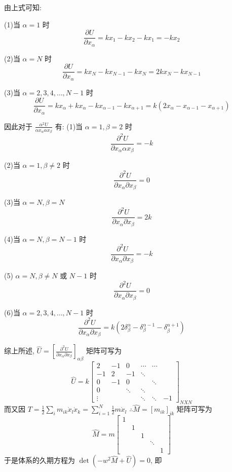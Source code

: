 \documentclass[11pt, a4paper, oneside]{ctexart}
\begin{document}
{{{\begin{appendices}
{        由上式可知:

        (1)当 $\alpha=1$ 时
        $$
        \frac{\partial U}{\partial x_{\alpha}}=k x_{1}-k x_{2}-k x_{1}=-k x_{2}
        $$

        (2)当 $\alpha=N$ 时
        $$
        \frac{\partial U}{\partial x_{\alpha}}=k x_{N}-k x_{N-1}-k x_{N}=2 k x_{N}-k x_{N-1}
        $$

        (3)当 $\alpha=2,3,4, \ldots, N-1$ 时
        $$
        \frac{\partial U}{\partial x_{\alpha}}=k x_{\alpha}+k x_{\alpha}-k x_{\alpha-1}-k x_{\alpha+1}=k\left(2 x_{\alpha}-x_{\alpha-1}-x_{\alpha+1}\right)
        $$

因此对于 $\frac{\alpha^{2} U}{\alpha x_{\alpha} \alpha x_{\beta}}$ 有:
(1)当 $\alpha=1, \beta=2$ 时
$$
\frac{\partial^{2} U}{\partial x_{\alpha} \alpha x_{\beta}}=-k
$$

(2)当 $\alpha=1, \beta \neq 2$ 时
$$
\frac{\partial^{2} U}{\partial x_{\alpha} \partial x_{\beta}}=0
$$

(3)当 $\alpha=N, \beta=N$
$$
\frac{\partial^{2} U}{\partial x_{\alpha} \partial x_{\beta}}=2 k
$$

(4)当 $\alpha=N, \beta=N-1$ 时
$$
\frac{\partial^{2} U}{\partial x_{\alpha} \partial x_{\beta}}=-k
$$

(5) $\alpha=N, \beta \neq N$ 或 $N-1$ 时
$$
\frac{\partial^{2} U}{\partial x_{\alpha} \partial x_{\beta}}=0
$$

(6)当 $\alpha=2,3,4, \ldots, N-1$ 时
$$
\frac{\partial^{2} U}{\partial x_{\alpha} \partial x_{\beta}}=k\left(2 \delta_{\beta}^{\alpha}-\delta_{\beta}^{\alpha-1}-\delta_{\beta}^{\alpha+1}\right)
$$

综上所述, $\hat{U}=\left[\frac{\partial^{2} U}{\partial x_{\alpha} \partial x_{\beta}}\right]_{\alpha \beta}$ 矩阵可写为
$$
\hat{U}=k\left[\begin{array}{cccccc}
2 & -1 & 0 & \cdots & \cdots & \\
-1 & 2 & -1 & \ddots & & \\
0 & -1 & 0 & & \ddots & \\
0 & & \ddots & \ddots & & \\
\vdots & & & \ddots & \ddots & -1
\end{array}\right]_{N X N}
$$
而又因 $T=\frac{1}{2} \sum_{i} m_{i k} \dot{x}_{l} \dot{x}_{k}=\sum_{i=1}^{N} \frac{1}{2} m \dot{x}_{l}$
$\therefore \hat{M}=\left[m_{i k}\right]_{i k}$ 矩阵可写为
$$
\hat{M}=m\left[\begin{array}{ccccc}
1 & & & & \\
& 1 & & & \\
& & 1 & & \\
& & & \ddots & \\
& & & & 1
\end{array}\right]
$$
于是体系的久期方程为 $\operatorname{det}\left(-w^{2} \hat{M}+\hat{U}\right)=0$, 即

}
\end{appendices}}}}
\end{document}
